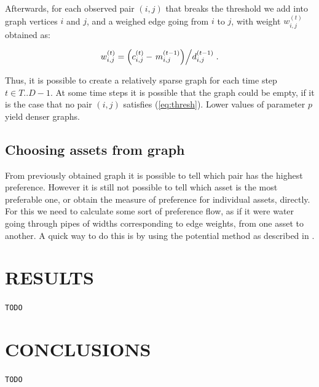 \documentclass[letterpaper, 10 pt, conference]{ieeeconf}
\begin{document}
  Afterwards, for each observed pair $(i,j)$ that breaks the threshold we add into graph vertices $i$ and $j$, and a weighed edge going from $i$ to $j$, with weight $w_{i,j}^{(t)}$ obtained as:
  
  \begin{equation}
    \label{eq:weight}
    w_{i,j}^{(t)} = \left(c_{i,j}^{(t)} - \left. m_{i,j}^{(t-1)}\right) \middle/ d_{i,j}^{(t-1)} \right..
  \end{equation}
  
  Thus, it is possible to create a relatively sparse graph for each time step $t \in T..D-1$.
  At some time steps it is possible that the graph could be empty, if it is the case that no pair $(i,j)$ satisfies (\ref{eq:thresh}).
  Lower values of parameter $p$ yield denser graphs.
  
  \subsection{Choosing assets from graph}
  
  From previously obtained graph it is possible to tell which pair has the highest preference.
  However it is still not possible to tell which asset is the most preferable one, or obtain the measure of preference for individual assets, directly.
  For this we need to calculate some sort of preference flow, as if it were water going through pipes of widths corresponding to edge weights, from one asset to another.
  A quick way to do this is by using the potential method as described in \cite{caklovic}.
      
  \section{RESULTS}
  
  \verb|TODO|

  \section{CONCLUSIONS}
  
  \verb|TODO|
    
  
\end{document}

